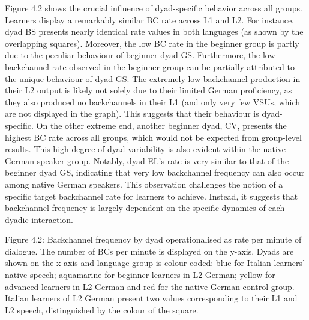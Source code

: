 \begin{styleStandard}
Figure 4.2 shows the crucial influence of dyad-specific behavior across all groups. Learners display a remarkably similar BC rate across L1 and L2. For instance, dyad BS presents nearly identical rate values in both languages (as shown by the overlapping squares). Moreover, the low BC rate in the beginner group is partly due to the peculiar behaviour of beginner dyad GS. Furthermore, the low backchannel rate observed in the beginner group can be partially attributed to the unique behaviour of dyad GS. The extremely low backchannel production in their L2 output is likely not solely due to their limited German proficiency, as they also produced no backchannels in their L1 (and only very few VSUs, which are not displayed in the graph). This suggests that their behaviour is dyad-specific. On the other extreme end, another beginner dyad, CV, presents the highest BC rate across all groups, which would not be expected from group-level results. This high degree of dyad variability is also evident within the native German speaker group. Notably, dyad EL's rate is very similar to that of the beginner dyad GS, indicating that very low backchannel frequency can also occur among native German speakers. This observation challenges the notion of a specific target backchannel rate for learners to achieve. Instead, it suggests that backchannel frequency is largely dependent on the specific dynamics of each dyadic interaction.
\end{styleStandard}

\begin{styleStandard}
  [Warning: Image ignored] %
 
\end{styleStandard}

\begin{stylecaption}
Figure 4.2: Backchannel frequency by dyad operationalised as rate per minute of dialogue. The number of BCs per minute is displayed on the y-axis. Dyads are shown on the x-axis and language group is colour-coded: blue for Italian learners’ native speech; aquamarine for beginner learners in L2 German; yellow for advanced learners in L2 German and red for the native German control group. Italian learners of L2 German present two values corresponding to their L1 and L2 speech, distinguished by the colour of the square.
\end{stylecaption}

